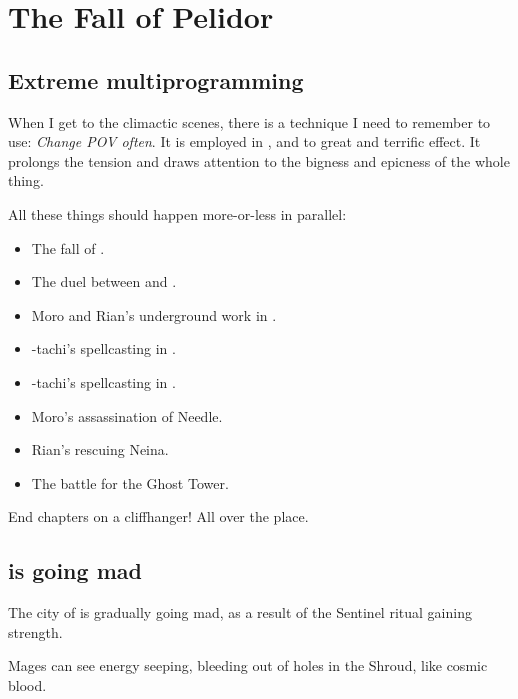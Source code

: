 \section{The Fall of Pelidor}









\subsection{Extreme multiprogramming}
When I get to the climactic scenes, there is a technique I need to remember to use: 
\emph{Change POV often}. 
It is employed in \cite{StevenEriksonIanCameronEsslemont:MalazanBookoftheFallen}, and to great and terrific effect. 
It prolongs the tension and draws attention to the bigness and epicness of the whole thing. 

All these things should happen more-or-less in parallel:
\begin{itemize}
  \item The fall of \Forclin. 
  \item The duel between \Teshrial{} and \Ishnaruchaefir. 
  \item Moro and Rian's underground work in \Malcur. 
  \item \Takestsha-tachi's spellcasting in \Forclin. 
  \item \Psyrex-tachi's spellcasting in \Malcur. 
  \item Moro's assassination of Needle. 
  \item Rian's rescuing Neina.  
  \item The battle for the Ghost Tower. 
\end{itemize}

End chapters on a cliffhanger! 
All over the place.









\subsection{\Malcur is going mad}
The city of \Malcur is gradually going mad, as a result of the Sentinel ritual gaining strength. 

Mages can see energy seeping, bleeding out of holes in the Shroud, like cosmic blood. 


